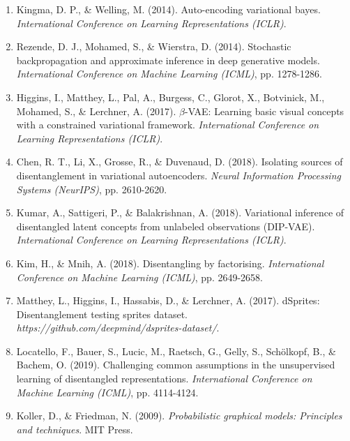 \documentclass[conference]{IEEEtran}
\begin{document}
\begin{enumerate}
    \item Kingma, D. P., \& Welling, M. (2014). Auto-encoding variational bayes. \textit{International Conference on Learning Representations (ICLR)}.
    
    \item Rezende, D. J., Mohamed, S., \& Wierstra, D. (2014). Stochastic backpropagation and approximate inference in deep generative models. \textit{International Conference on Machine Learning (ICML)}, pp. 1278-1286.
    
    \item Higgins, I., Matthey, L., Pal, A., Burgess, C., Glorot, X., Botvinick, M., Mohamed, S., \& Lerchner, A. (2017). $\beta$-VAE: Learning basic visual concepts with a constrained variational framework. \textit{International Conference on Learning Representations (ICLR)}.
    
    \item Chen, R. T., Li, X., Grosse, R., \& Duvenaud, D. (2018). Isolating sources of disentanglement in variational autoencoders. \textit{Neural Information Processing Systems (NeurIPS)}, pp. 2610-2620.
    
    \item Kumar, A., Sattigeri, P., \& Balakrishnan, A. (2018). Variational inference of disentangled latent concepts from unlabeled observations (DIP-VAE). \textit{International Conference on Learning Representations (ICLR)}.
    
    \item Kim, H., \& Mnih, A. (2018). Disentangling by factorising. \textit{International Conference on Machine Learning (ICML)}, pp. 2649-2658.
    
    \item Matthey, L., Higgins, I., Hassabis, D., \& Lerchner, A. (2017). dSprites: Disentanglement testing sprites dataset. \textit{https://github.com/deepmind/dsprites-dataset/}.
    
    \item Locatello, F., Bauer, S., Lucic, M., Raetsch, G., Gelly, S., Schölkopf, B., \& Bachem, O. (2019). Challenging common assumptions in the unsupervised learning of disentangled representations. \textit{International Conference on Machine Learning (ICML)}, pp. 4114-4124.
    
    \item Koller, D., \& Friedman, N. (2009). \textit{Probabilistic graphical models: Principles and techniques}. MIT Press.
    

\end{enumerate}
\end{document}
